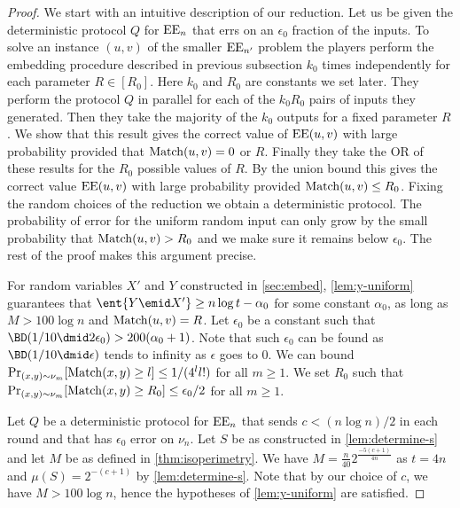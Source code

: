 \begin{proof}
We start with an intuitive description of our reduction. Let us
be given the deterministic protocol $Q$ for $\operatorname{EE}_n$ that errs on
an $\epsilon_0$ fraction of the inputs. To solve an instance
$(u,v)$ of the smaller $\operatorname{EE}_{n'}$ problem the players perform
the embedding procedure described in previous subsection $k_0$
times independently for each parameter $R\in[R_0]$. Here $k_0$
and $R_0$ are constants we set later. They perform the protocol
$Q$ in parallel for each of the $k_0R_0$ pairs of inputs they
generated. Then they take the majority of the $k_0$ outputs for
a fixed parameter $R$. We show that this result gives the
correct value of $\operatorname{EE}(u,v)$ with large probability provided that
$\operatorname{Match}(u,v)=0$ or $R$. Finally they take the OR of these
results for the $R_0$ possible values of $R$. By the union bound
this gives the correct value $\operatorname{EE}(u,v)$ with large probability
provided $\operatorname{Match}(u,v)\le R_0$. Fixing the random choices of the
reduction we obtain a deterministic protocol. The probability of
error for the uniform random input can only grow by the small
probability that $\operatorname{Match}(u,v)>R_0$ and we make sure it remains
below $\epsilon_0$. The rest of the proof makes this argument
precise.

For random variables $X'$ and $Y$ constructed in
\autoref{sec:embed}, \autoref{lem:y-uniform} guarantees that
$\ent{Y\emid X'}\ge n\log t - \alpha_0$ for some constant
$\alpha_0$, as long as $M>100\log n$ and $\operatorname{Match}(u,v)=R$. Let
$\epsilon_0$ be a constant such that $\BD(1/10\dmid 2\epsilon_0)
> 200(\alpha_0 + 1)$. Note that such $\epsilon_0$ can be found
as $\BD(1/10\dmid \epsilon)$ tends to infinity as $\epsilon$
goes to 0. We can bound $\Pr_{(x,y)\sim\nu_m}[\operatorname{Match}(x,y) \ge l]
\le 1/(4^l l!)$ for all $m\ge1$. We set $R_0$ such that
$\Pr_{(x,y)\sim\nu_m}[\operatorname{Match}(x,y) \ge R_0 ] \le \epsilon_0 / 2$
for all $m\ge1$.

Let $Q$ be a deterministic protocol for $\operatorname{EE}_n$ that sends $c <
(n\log n)/2$ in each round and that has $\epsilon_0$ error on
$\nu_n$. Let $S$ be as constructed in \autoref{lem:determine-s}
and let $M$ be as defined in \autoref{thm:isoperimetry}. We have
$M=\frac{n}{40}2^{\frac{-5(c+1)}{4n}}$ as $t=4n$ and
$\mu(S)=2^{-(c+1)}$ by \autoref{lem:determine-s}. Note that by
our choice of $c$, we have $M>100\log n$, hence the hypotheses
of \autoref{lem:y-uniform} are satisfied.


\end{proof}
